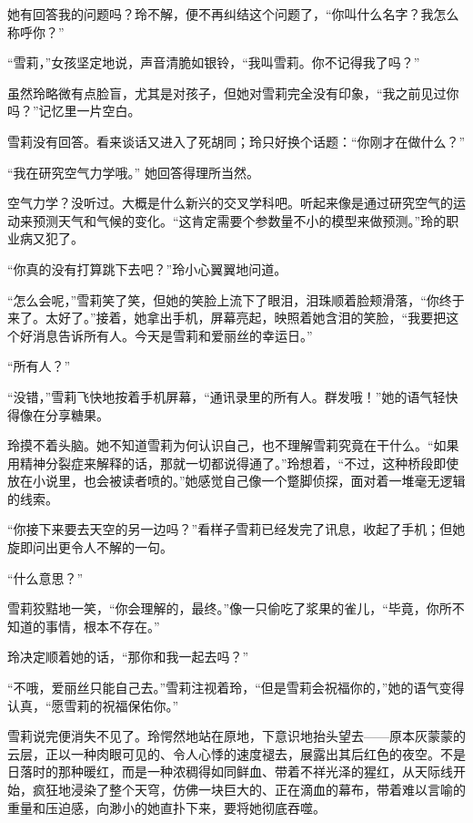 她有回答我的问题吗？玲不解，便不再纠结这个问题了，“你叫什么名字？我怎么称呼你？”

“雪莉，”女孩坚定地说，声音清脆如银铃，“我叫雪莉。你不记得我了吗？”

虽然玲略微有点脸盲，尤其是对孩子，但她对雪莉完全没有印象，“我之前见过你吗？”记忆里一片空白。

雪莉没有回答。看来谈话又进入了死胡同；玲只好换个话题：“你刚才在做什么？”

“我在研究空气力学哦。” 她回答得理所当然。

空气力学？没听过。大概是什么新兴的交叉学科吧。听起来像是通过研究空气的运动来预测天气和气候的变化。“这肯定需要个参数量不小的模型来做预测。”玲的职业病又犯了。

“你真的没有打算跳下去吧？”玲小心翼翼地问道。

“怎么会呢，”雪莉笑了笑，但她的笑脸上流下了眼泪，泪珠顺着脸颊滑落，“你终于来了。太好了。”接着，她拿出手机，屏幕亮起，映照着她含泪的笑脸，“我要把这个好消息告诉所有人。今天是雪莉和爱丽丝的幸运日。”

“所有人？”

“没错，”雪莉飞快地按着手机屏幕，“通讯录里的所有人。群发哦！”她的语气轻快得像在分享糖果。

玲摸不着头脑。她不知道雪莉为何认识自己，也不理解雪莉究竟在干什么。“如果用精神分裂症来解释的话，那就一切都说得通了。”玲想着，“不过，这种桥段即使放在小说里，也会被读者喷的。”她感觉自己像一个蹩脚侦探，面对着一堆毫无逻辑的线索。

“你接下来要去天空的另一边吗？”看样子雪莉已经发完了讯息，收起了手机；但她旋即问出更令人不解的一句。

“什么意思？”

雪莉狡黠地一笑，“你会理解的，最终。”像一只偷吃了浆果的雀儿，“毕竟，你所不知道的事情，根本不存在。”

玲决定顺着她的话，“那你和我一起去吗？”

“不哦，爱丽丝只能自己去。”雪莉注视着玲，“但是雪莉会祝福你的，”她的语气变得认真，“愿雪莉的祝福保佑你。”

雪莉说完便消失不见了。玲愕然地站在原地，下意识地抬头望去——原本灰蒙蒙的云层，正以一种肉眼可见的、令人心悸的速度褪去，展露出其后红色的夜空。不是日落时的那种暖红，而是一种浓稠得如同鲜血、带着不祥光泽的猩红，从天际线开始，疯狂地浸染了整个天穹，仿佛一块巨大的、正在滴血的幕布，带着难以言喻的重量和压迫感，向渺小的她直扑下来，要将她彻底吞噬。

